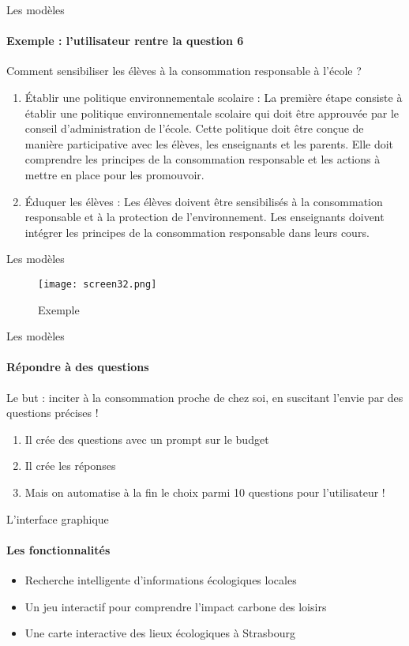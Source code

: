 \documentclass{beamer}
\begin{document}
\begin{frame}{Les modèles}
\framesubtitle{Exemple : l'utilisateur rentre la question 6} 

Comment sensibiliser les élèves à la consommation responsable à l'école ?

\begin{enumerate}
    \item Établir une politique environnementale scolaire : La première étape consiste à établir une politique environnementale scolaire qui doit être approuvée par le conseil d'administration de l'école. Cette politique doit être conçue de manière participative avec les élèves, les enseignants et les parents. Elle doit comprendre les principes de la consommation responsable et les actions à mettre en place pour les promouvoir.
    \item Éduquer les élèves : Les élèves doivent être sensibilisés à la consommation responsable et à la protection de l'environnement. Les enseignants doivent intégrer les principes de la consommation responsable dans leurs cours.
\end{enumerate}
    
\end{frame}

\begin{frame}{Les modèles}
\begin{figure}
        \centering
        \texttt{[image: screen32.png]}
        \caption{Exemple}
        \label{fig:enter-label}
    \end{figure}
        
\end{frame}

\begin{frame}{Les modèles}
\framesubtitle{Répondre à des questions}
Le but : inciter à la consommation proche de chez soi, en suscitant l’envie par des questions précises ! 

\begin{enumerate}
    \item Il crée des questions avec un prompt sur le budget
    \item Il crée les réponses
    \item Mais on automatise à la fin le choix parmi 10 questions pour l’utilisateur ! 
\end{enumerate}
\end{frame}


\begin{frame}{L'interface graphique}
\framesubtitle{Les fonctionnalités}

\begin{itemize}
    \item Recherche intelligente d'informations écologiques locales
    \item Un jeu interactif pour comprendre l'impact carbone des loisirs
    \item Une carte interactive des lieux écologiques à Strasbourg
\end{itemize}
    
\end{frame}
\end{document}
